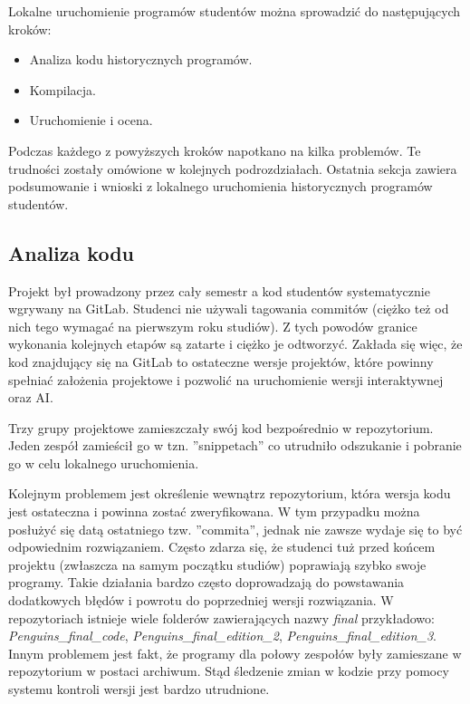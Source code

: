 Lokalne uruchomienie programów studentów można sprowadzić do następujących kroków:
\begin{itemize}
    \item Analiza kodu historycznych programów.
    \item Kompilacja.
    \item Uruchomienie i ocena.
\end{itemize}

Podczas każdego z powyższych kroków napotkano na kilka problemów.
Te trudności zostały omówione w kolejnych podrozdziałach.
Ostatnia sekcja zawiera podsumowanie i wnioski z lokalnego uruchomienia historycznych programów studentów.

\subsection{Analiza kodu}

Projekt był prowadzony przez cały semestr a kod studentów systematycznie wgrywany na GitLab.
Studenci nie używali tagowania commitów (ciężko też od nich tego wymagać na pierwszym roku studiów).
Z tych powodów granice wykonania kolejnych etapów są zatarte i ciężko je odtworzyć.
Zakłada się więc, że kod znajdujący się na GitLab to ostateczne wersje projektów, które powinny spełniać założenia projektowe i pozwolić na uruchomienie wersji interaktywnej oraz AI.

Trzy grupy projektowe zamieszczały swój kod bezpośrednio w repozytorium.
Jeden zespół zamieścił go w tzn. ”snippetach” co utrudniło odszukanie i pobranie go w celu lokalnego uruchomienia.

Kolejnym problemem jest określenie wewnątrz repozytorium, która wersja kodu jest ostateczna i powinna zostać zweryfikowana.
W tym przypadku można posłużyć się datą ostatniego tzw. ”commita”, jednak nie zawsze wydaje się to być odpowiednim rozwiązaniem.
Często zdarza się, że studenci tuż przed końcem projektu (zwłaszcza na samym początku studiów) poprawiają szybko swoje programy.
Takie działania bardzo często doprowadzają do powstawania dodatkowych błędów i powrotu do poprzedniej wersji rozwiązania.
W repozytoriach istnieje wiele folderów zawierających nazwy \textit{final} przykładowo: \textit{Penguins\_final\_code}, \textit{Penguins\_final\_edition\_2}, \textit{Penguins\_final\_edition\_3}.
Innym problemem jest fakt, że programy dla połowy zespołów były zamieszane w repozytorium w postaci archiwum.
Stąd śledzenie zmian w kodzie przy pomocy systemu kontroli wersji jest bardzo utrudnione.

